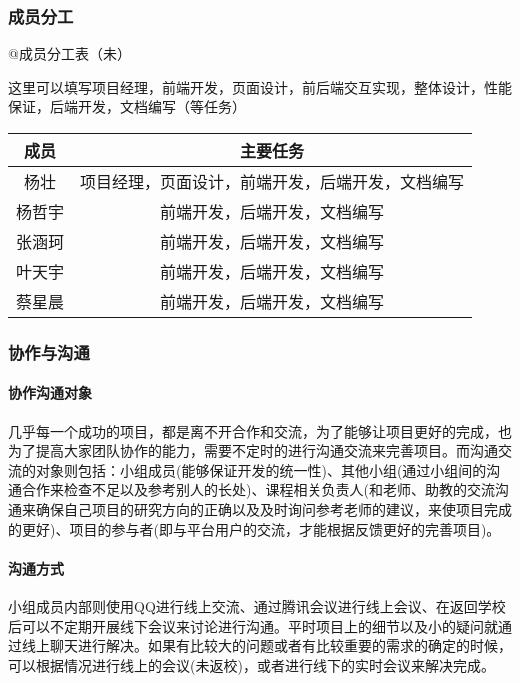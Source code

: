 \documentclass[
]{article}
\newenvironment{Shaded}{}{}
\newcommand{\NormalTok}[1]{#1}
\begin{document}
\hypertarget{header-n3397}{%
\subsubsection{成员分工}\label{header-n3397}}

@成员分工表（未）

\begin{Shaded}
\begin{Highlighting}[]
\NormalTok{这里可以填写项目经理，前端开发，页面设计，前后端交互实现，整体设计，性能保证，后端开发，文档编写（等任务）}
\end{Highlighting}
\end{Shaded}

\begin{longtable}[]{@{}cc@{}}
\toprule
成员 & 主要任务\tabularnewline
\midrule
\endhead
杨壮 & 项目经理，页面设计，前端开发，后端开发，文档编写\tabularnewline
杨哲宇 & 前端开发，后端开发，文档编写\tabularnewline
张涵珂 & 前端开发，后端开发，文档编写\tabularnewline
叶天宇 & 前端开发，后端开发，文档编写\tabularnewline
蔡星晨 & 前端开发，后端开发，文档编写\tabularnewline
\bottomrule
\end{longtable}

\hypertarget{header-n3419}{%
\subsubsection{协作与沟通}\label{header-n3419}}

\hypertarget{header-n3420}{%
\paragraph{协作沟通对象}\label{header-n3420}}

几乎每一个成功的项目，都是离不开合作和交流，为了能够让项目更好的完成，也为了提高大家团队协作的能力，需要不定时的进行沟通交流来完善项目。而沟通交流的对象则包括：小组成员(能够保证开发的统一性)、其他小组(通过小组间的沟通合作来检查不足以及参考别人的长处)、课程相关负责人(和老师、助教的交流沟通来确保自己项目的研究方向的正确以及及时询问参考老师的建议，来使项目完成的更好)、项目的参与者(即与平台用户的交流，才能根据反馈更好的完善项目)。

\hypertarget{header-n3422}{%
\paragraph{沟通方式}\label{header-n3422}}

小组成员内部则使用QQ进行线上交流、通过腾讯会议进行线上会议、在返回学校后可以不定期开展线下会议来讨论进行沟通。平时项目上的细节以及小的疑问就通过线上聊天进行解决。如果有比较大的问题或者有比较重要的需求的确定的时候，可以根据情况进行线上的会议(未返校)，或者进行线下的实时会议来解决完成。
\end{document}
